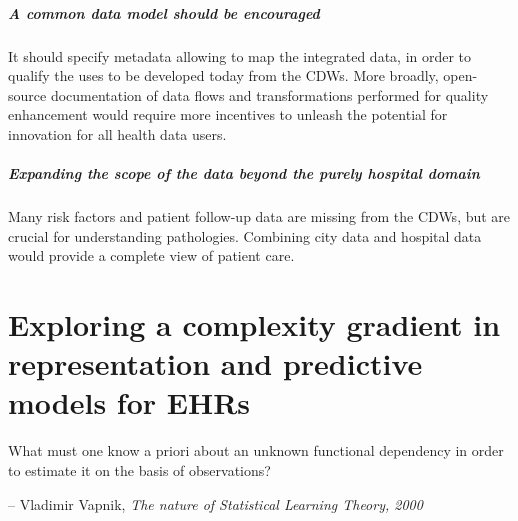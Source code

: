 \documentclass[french,12pt,twoside,a4paper]{book}
\newenvironment{citationbox}{
  \begin{tcolorbox}[
      enhanced,
      colback=gray!10, %
      colframe=white, %
      arc=0mm, %
      boxrule=0.5pt, %
      rightrule=0pt, %
      left=0pt, %
      right=0pt, %
      top=0pt, %
      bottom=0pt, %
      rightupper=0mm, %
      rightlower=0mm, %
      width=0.9\textwidth,
      flush right,
    ]
    \footnotesize %
    \itshape %
    }{
  \end{tcolorbox}%
}
\begin{document}
\paragraph{A common data model should be encouraged} It should specify metadata allowing to map
the integrated data, in order to qualify the uses to be developed today from the
CDWs. More broadly, open-source documentation of data flows and transformations
performed for quality enhancement would require more incentives to unleash the
potential for innovation for all health data users.

\paragraph{Expanding the scope of the data beyond the purely hospital domain}
Many risk factors and patient follow-up data are missing from the CDWs, but are
crucial for understanding pathologies. Combining city data and hospital data
would provide a complete view of patient care.


\chapter{Exploring a complexity gradient in representation and predictive models for EHRs}\label{chapter:predictive_models}

\begin{citationbox}
  What must one know a priori about an unknown functional dependency in order to
  estimate it on the basis of observations?
  \par\hfill -- Vladimir Vapnik, \textit{The nature of Statistical Learning Theory, 2000}
\end{citationbox}
\end{document}
